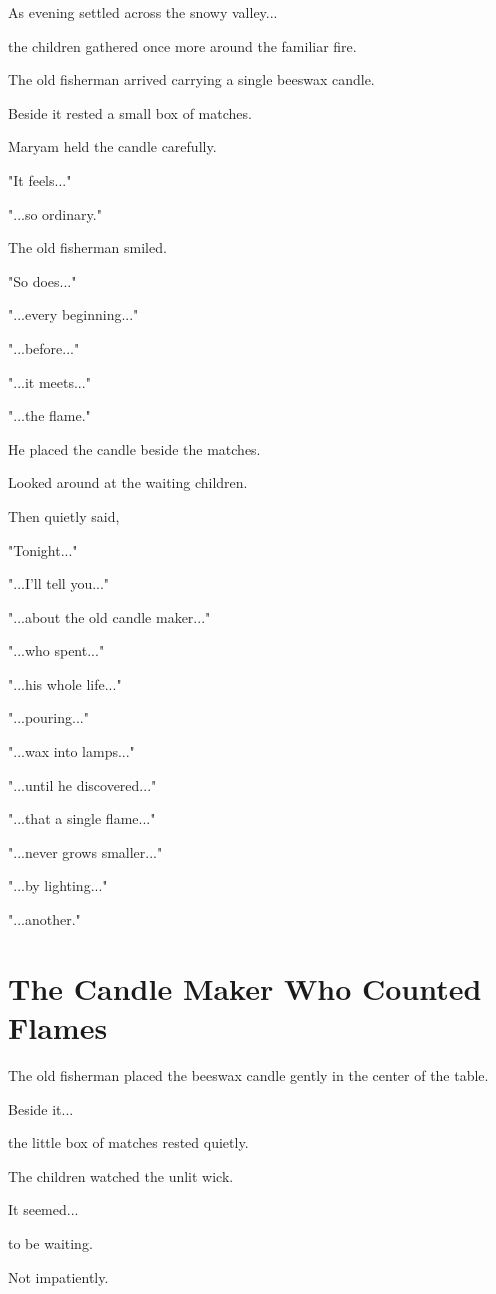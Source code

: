 \documentclass[12pt,openany]{book}
\begin{document}
As evening settled across the snowy valley...

the children gathered once more around the familiar fire.

The old fisherman arrived carrying a single beeswax candle.

Beside it rested a small box of matches.

Maryam held the candle carefully.

"It feels..."

"...so ordinary."

The old fisherman smiled.

"So does..."

"...every beginning..."

"...before..."

"...it meets..."

"...the flame."

He placed the candle beside the matches.

Looked around at the waiting children.

Then quietly said,

"Tonight..."

"...I'll tell you..."

"...about the old candle maker..."

"...who spent..."

"...his whole life..."

"...pouring..."

"...wax into lamps..."

"...until he discovered..."

"...that a single flame..."

"...never grows smaller..."

"...by lighting..."

"...another."
\section*{The Candle Maker Who Counted Flames}

The old fisherman placed the beeswax candle gently in the center of the table.

Beside it...

the little box of matches rested quietly.

The children watched the unlit wick.

It seemed...

to be waiting.

Not impatiently.
\end{document}
